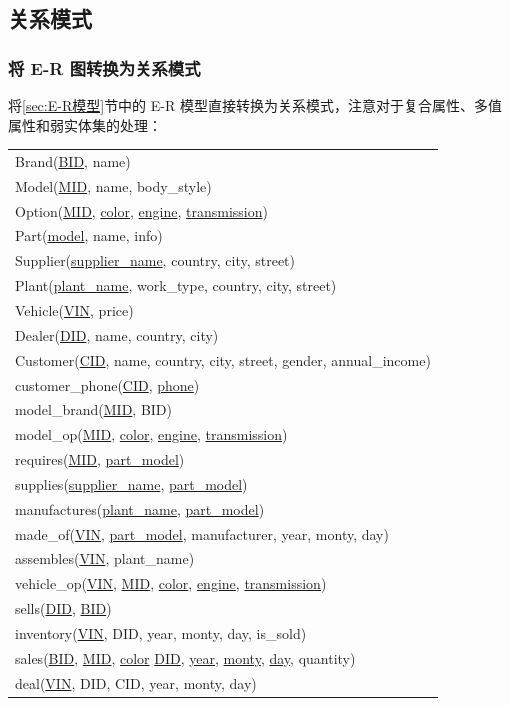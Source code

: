 \documentclass[hyperref,a4paper,UTF8]{ctexart}
\begin{document}
\subsection{关系模式}

\subsubsection{将 E-R 图转换为关系模式}

将\ref{sec:E-R模型}节中的 E-R 模型直接转换为关系模式，注意对于复合属性、多值属性和弱实体集的处理：

\begin{center}
    \begin{tabular}{l}
        Brand(\underline{BID}, name)\\
        Model(\underline{MID}, name, body\_style)\\
        Option(\underline{MID}, \underline{color}, \underline{engine}, \underline{transmission})\\
        Part(\underline{model}, name, info)\\
        Supplier(\underline{supplier\_name}, country, city, street)\\
        Plant(\underline{plant\_name}, work\_type, country, city, street)\\
        Vehicle(\underline{VIN}, price)\\
        Dealer(\underline{DID}, name, country, city)\\
        Customer(\underline{CID}, name, country, city, street, gender, annual\_income)\\
        customer\_phone(\underline{CID}, \underline{phone})\\
        model\_brand(\underline{MID}, BID)\\
        model\_op(\underline{MID}, \underline{color}, \underline{engine}, \underline{transmission})\\
        requires(\underline{MID}, \underline{part\_model})\\
        supplies(\underline{supplier\_name}, \underline{part\_model})\\
        manufactures(\underline{plant\_name}, \underline{part\_model})\\
        made\_of(\underline{VIN}, \underline{part\_model}, manufacturer, year, monty, day)\\
        assembles(\underline{VIN}, plant\_name)\\
        vehicle\_op(\underline{VIN}, \underline{MID}, \underline{color}, \underline{engine}, \underline{transmission})\\
        sells(\underline{DID}, \underline{BID})\\
        inventory(\underline{VIN}, DID, year, monty, day, is\_sold)\\
        sales(\underline{BID}, \underline{MID}, \underline{color} \underline{DID}, \underline{year}, \underline{monty}, \underline{day}, quantity)\\
        deal(\underline{VIN}, DID, CID, year, monty, day)
    \end{tabular}
\end{center}
\end{document}

